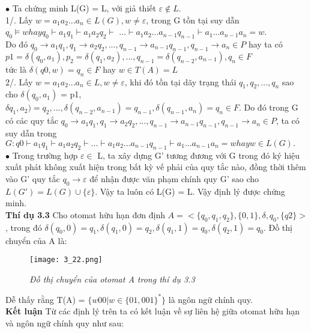 \begin{flushleft}
\hspace{10mm}$\bullet$ Ta chứng minh L(G) = L, với giả thiết $\varepsilon \not \in L.$\\
1/. Lấy $w = a_1a_2...a_n \in L(G), w \ne \varepsilon$, trong G tồn tại suy dẫn $q_0 \models w hay q_0 \vdash a_1q_1 \vdash a_1a_2q_2 \vdash$
$... \vdash a_1a_2...a_{n-1}q_{n-1} \vdash a_1...a_{n-1}a_n = w.$\\
Do đó $q_0 \to a_1q_1, q_1 \to a_2q_2,..., q_{n-1} \to a_{n-1}q_{n-1}, q_{n-1} \to a_n \in P$ hay ta có\\
$p1 = \delta(q_0, a_1), p_2 = \delta(q_1, a_2),..., q_{n-1} = \delta(q_{n-2}, a_{n-1}), q_n \in F$\\
tức là $\delta(q0, w) = q_n \in F$ hay $w  \in T(A) = L$\\
2/. Lấy $w = a_1a_2...a_n \in L, w \ne \varepsilon$, khi đó tồn tại dãy trạng thái $q_1, q_2,..., q_n$ sao cho $\delta(q_0, a_1)$ = p1, $\delta q_1, a_2) = q_2,..., \delta(q_{n-2}, a_{n-1}) = q_{n-1}, \delta(q_{n-1}, a_n) = q_n \in F$. Do đó trong G có các quy tắc $q_0 \to a_1q_1, q_1 \to a_2q_2,..., q_{n-1} \to a_{n-1}q_{n-1}, q_{n-1} \to a_n \in P$, ta có suy dẫn trong $G: q0 \vdash a_1q_1 \vdash a_1a_2q_2 \vdash
...\vdash a_1a_2...a_{n-1}q_{n-1}\vdash a_1...a_{n-1}a_n = w hay w \in L(G).$\\
\hspace{10mm}$\bullet$ Trong trường hợp $\varepsilon \in$ L, ta xây dựng G' tương đương với G trong đó ký hiệu xuất
phát không xuất hiện trong bất kỳ vế phải của quy tắc nào, đồng thời thêm vào G' quy tắc
$q_0 \to \varepsilon$ để nhận được văn phạm chính quy G’ sao cho $L(G') = L(G) \cup \{\varepsilon\}$. Vậy ta luôn có
L(G) = L. Vậy định lý được chứng minh.\\
\hspace{10mm} \textbf{Thí dụ 3.3} Cho otomat hữu hạn đơn định $A = <\{q_0, q_1, q_2\}, \{0, 1\}, \delta, q_0, \{q2\}>$, trong
đó $\delta(q_0, 0) = q_1, \delta(q_1, 0) = q_2, \delta(q_1, 1) = q_0, \delta(q_2, 1) = q_0$. Đồ thị chuyển của A là:\\
\begin{figure}[ht]
\texttt{[image: 3\_22.png]}
\caption{ \textit{Đồ thị chuyển của otomat A trong thí dụ 3.3}}
\end{figure}
Dễ thấy rằng T(A) = $\{w00 | w \in \{01, 001\}^*\}$ là ngôn ngữ chính quy.\\
\textbf{Kết luận} Từ các định lý trên ta có kết luận về sự liên hệ giữa otomat hữu hạn và ngôn ngữ chính quy như sau:\\

\end{flushleft}
